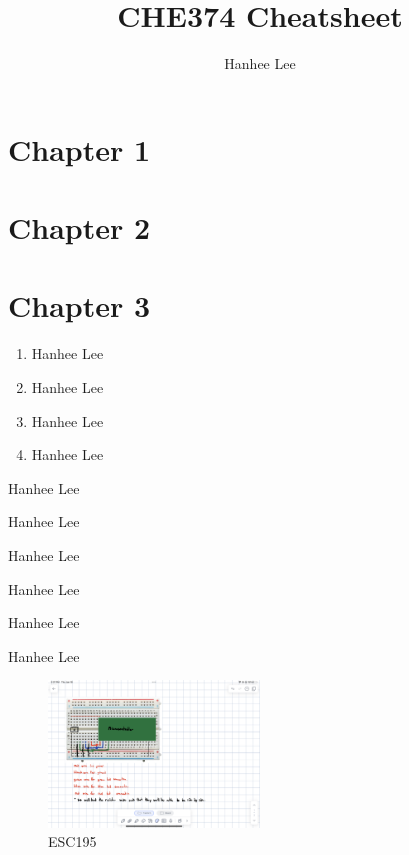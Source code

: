 \documentclass{article}
\title{CHE374 Cheatsheet}
\author{Hanhee Lee}
\begin{document}
    \maketitle
    \tableofcontents
    \section{Chapter 1}
    \section{Chapter 2}
    \section{Chapter 3}

\begin{process}
    \begin{enumerate}
        \item Hanhee Lee
        \item Hanhee Lee
        \item Hanhee Lee
        \item Hanhee Lee
    \end{enumerate}
\end{process}

\begin{example}
    Hanhee Lee
\end{example}

\begin{definition}
    
\end{definition}

\begin{theorem}
    Hanhee Lee
\end{theorem}

\begin{derivation}
    Hanhee Lee
\end{derivation}

\begin{intuition}
    Hanhee Lee
\end{intuition}

\begin{warning}
    Hanhee Lee
\end{warning}

\begin{summary}
    Hanhee Lee
\end{summary}

\begin{figure}[H]
    \centering
    \includegraphics[width=0.5\textwidth]{00_Images/diagram_circuit.png}
    \caption{ESC195}
\end{figure}
\end{document}
